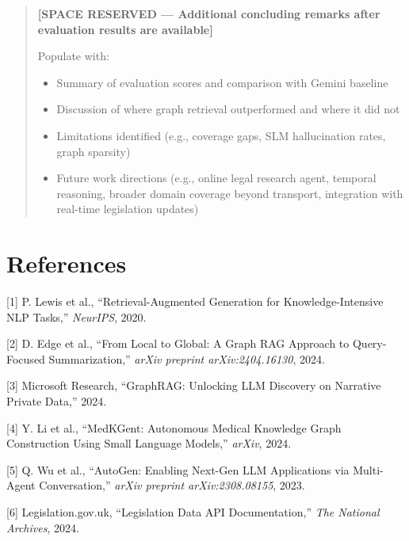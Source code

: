 \documentclass[10pt, a4paper, twocolumn]{article}
\begin{document}
\begin{quote}
\textbf{[SPACE RESERVED — Additional concluding remarks after evaluation results are available]}

Populate with:
\begin{itemize}
    \item Summary of evaluation scores and comparison with Gemini baseline
    \item Discussion of where graph retrieval outperformed and where it did not
    \item Limitations identified (e.g., coverage gaps, SLM hallucination rates, graph sparsity)
    \item Future work directions (e.g., online legal research agent, temporal reasoning, broader domain coverage beyond transport, integration with real-time legislation updates)
\end{itemize}
\end{quote}

\section*{References}

[1] P. Lewis et al., ``Retrieval-Augmented Generation for Knowledge-Intensive NLP Tasks,'' \textit{NeurIPS}, 2020.

[2] D. Edge et al., ``From Local to Global: A Graph RAG Approach to Query-Focused Summarization,'' \textit{arXiv preprint arXiv:2404.16130}, 2024.

[3] Microsoft Research, ``GraphRAG: Unlocking LLM Discovery on Narrative Private Data,'' 2024.

[4] Y. Li et al., ``MedKGent: Autonomous Medical Knowledge Graph Construction Using Small Language Models,'' \textit{arXiv}, 2024.

[5] Q. Wu et al., ``AutoGen: Enabling Next-Gen LLM Applications via Multi-Agent Conversation,'' \textit{arXiv preprint arXiv:2308.08155}, 2023.

[6] Legislation.gov.uk, ``Legislation Data API Documentation,'' \textit{The National Archives}, 2024.
\end{document}
